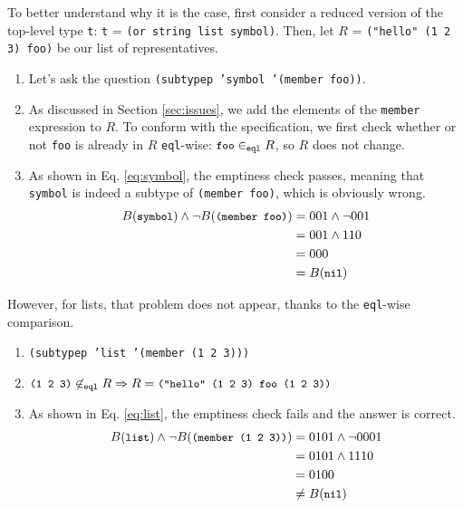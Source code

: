 \documentclass[format=sigconf]{acmart}
\newcommand\code[2][\small]{\sloppy\texttt{#1#2}}
\newcommand\mcode[2][\small]{\text{\code[#1]{#2}}}
\theoremstyle{definition}
\begin{document}
To better understand why it is the case, first consider a reduced version of the
top-level type \code{t}: \code{t} = \code{(or string list symbol)}. Then, let
$R$ = \code{("hello" (1 2 3) foo)} be our list of representatives.
\begin{enumerate}
\item Let's ask the question \code{(subtypep 'symbol '(member foo))}.
\item As discussed in Section \ref{sec:issues}, we add the elements of the
  \code{member} expression to $R$. To conform with the specification, we first
  check whether or not \code{foo} is already in $R$ \code{eql}-wise:
  $\mcode{foo} \in_{\mcode[\scriptsize]{eql}} R$, so $R$ does not change.
\item As shown in Eq. \ref{eq:symbol}, the emptiness check passes, meaning that
  \code{symbol} is indeed a subtype of \code{(member foo)}, which is obviously
  wrong.
  \begin{align}
    B(\mcode{symbol}) \wedge \neg B(\mcode{(member foo)}) &= 001 \wedge \neg 001 \label{eq:symbol}\\
                                                          &= 001 \wedge 110 \nonumber\\
                                                          &= 000 \nonumber\\
                                                          &= B(\mcode{nil}) \nonumber
  \end{align}
\end{enumerate}

However, for lists, that problem does not appear, thanks to the \code{eql}-wise
comparison.
\begin{enumerate}
\item \code{(subtypep 'list '(member (1 2 3)))}
\item $\mcode{(1 2 3)} \not\in_{\mcode[\scriptsize]{eql}} R \Rightarrow R =
  \mcode{("hello" (1 2 3) foo (1 2 3))}$
\item As shown in Eq. \ref{eq:list}, the emptiness check fails and the answer is
  correct.
  \begin{align}
    B(\mcode{list}) \wedge \neg B(\mcode{(member (1 2 3))}) &= 0101 \wedge \neg 0001 \label{eq:list}\\
                                                            &= 0101 \wedge 1110 \nonumber\\
                                                            &= 0100 \nonumber\\
                                                            &\not= B(\mcode{nil}) \nonumber
  \end{align}
\end{enumerate}
\end{document}
